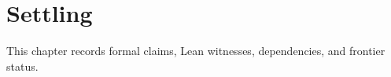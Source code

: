\chapter{Settling}\label{ch:settling}

This chapter records formal claims, Lean witnesses, dependencies, and frontier status.









